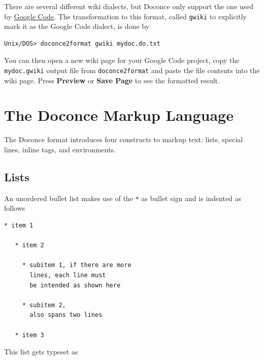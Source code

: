 \documentclass{article}
\begin{document}
There are several different wiki dialects, but Doconce only support the
one used by \href{http://code.google.com/p/support/wiki/WikiSyntax}{Google Code}.
The transformation to this format, called {\fontsize{10pt}{10pt}\verb!gwiki!} to explicitly mark
it as the Google Code dialect, is done by
\begin{Verbatim}[fontsize=\fontsize{9pt}{9pt},tabsize=8,baselinestretch=0.85,
fontfamily=tt,xleftmargin=7mm]
Unix/DOS> doconce2format gwiki mydoc.do.txt
\end{Verbatim}
\noindent
You can then open a new wiki page for your Google Code project, copy
the {\fontsize{10pt}{10pt}\verb!mydoc.gwiki!} output file from {\fontsize{10pt}{10pt}\verb!doconce2format!} and paste the
file contents into the wiki page. Press \textbf{Preview} or \textbf{Save Page} to
see the formatted result.


\section{The Doconce Markup Language}

The Doconce format introduces four constructs to markup text:
lists, special lines, inline tags, and environments.

\subsection{Lists}

An unordered bullet list makes use of the {\fontsize{10pt}{10pt}\verb!*!} as bullet sign
and is indented as follows
\begin{Verbatim}[fontsize=\fontsize{9pt}{9pt},tabsize=8,baselinestretch=0.85,
fontfamily=tt,xleftmargin=7mm]
   * item 1

   * item 2

     * subitem 1, if there are more
       lines, each line must
       be intended as shown here

     * subitem 2,
       also spans two lines

   * item 3
\end{Verbatim}
\noindent

This list gets typeset as
\end{document}
